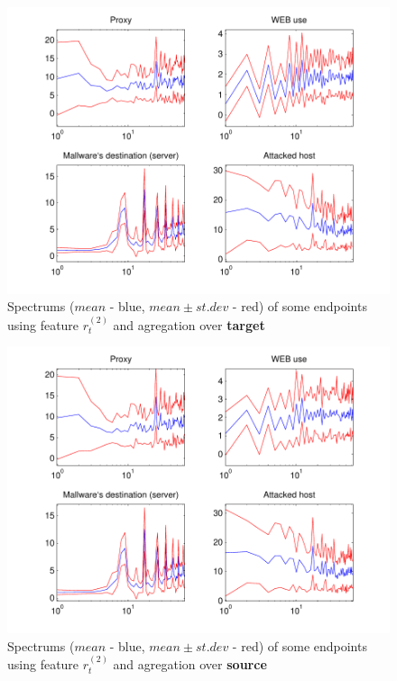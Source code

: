 \documentclass[a4paper,journal]{IEEEtran}
\begin{document}
\begin{figure}[h!]%
  \centering
  \includegraphics[width=140mm]{spect_dst_logp}
  \caption{Spectrums ($mean$ - blue, $mean\pm st.dev$ - red) of some  endpoints using feature $r_t^{(2)}$ and agregation over \textbf{target}}
  \label{fig:spect_dst_logp}
\end{figure}
\begin{figure}[h!]%
  \centering
  \includegraphics[width=140mm]{spect_src_logp}
  \caption{Spectrums ($mean$ - blue, $mean\pm st.dev$ - red) of some  endpoints using feature $r_t^{(2)}$ and agregation over \textbf{source}}
  \label{fig:spect_src_logp}
\end{figure}
\end{document}
